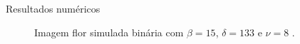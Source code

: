\documentclass[10pt]{beamer}
\begin{document}
\begin{frame}{Resultados numéricos}
\begin{figure}[hbt]
	\caption{Imagem flor simulada binária com $\beta = 15$, $\delta = 133$ e $\nu = 8$ .}
\endminipage
\end{figure}
\end{frame}
\end{document}

